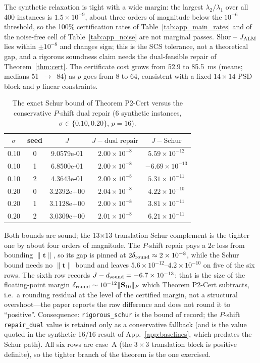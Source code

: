 The synthetic relaxation is tight with a wide margin: the largest $\lambda_2/\lambda_1$ over all 400 instances is $1.5\times10^{-9}$, about three orders of magnitude below the $10^{-6}$ threshold, so the 100\% certification rates of Table~\ref{tab:app_main_rates} and of the noise-free cell of Table~\ref{tab:app_noise} are not marginal passes. $\mathrm{Shor}-J_{\rm ALM}$ lies within $\pm10^{-8}$ and changes sign; this is the SCS tolerance, not a theoretical gap, and a rigorous soundness claim needs the dual-feasible repair of Theorem~\ref{thm:cert}. The certificate cost grows from 52.9 to 85.5~ms (means; medians 51~$\to$~84) as $p$ goes from 8 to 64, consistent with a fixed $14\times14$ PSD block and $p$ linear constraints.

\begin{table}[t]
\centering
\caption{The exact Schur bound of Theorem P2-Cert versus the conservative $P$-shift dual repair (6 synthetic instances, $\sigma\in\{0.10,0.20\}$, $p=16$).}
\label{tab:app_schur}
\scriptsize
\setlength{\tabcolsep}{3pt}
\begin{tabular}{@{}ccccc@{}}
\toprule
$\sigma$ & seed & $J$ & $J-\text{dual repair}$ & $J-\text{Schur}$ \\
\midrule
0.10 & 0 & 9.0579e-01 & $2.00\times10^{-8}$ & $5.59\times10^{-12}$ \\
0.10 & 1 & 6.8500e-01 & $2.00\times10^{-8}$ & $-6.69\times10^{-13}$ \\
0.10 & 2 & 4.3643e-01 & $2.00\times10^{-8}$ & $5.31\times10^{-11}$ \\
0.20 & 0 & 3.2392e+00 & $2.04\times10^{-8}$ & $4.22\times10^{-10}$ \\
0.20 & 1 & 3.1128e+00 & $2.00\times10^{-8}$ & $3.81\times10^{-11}$ \\
0.20 & 2 & 3.0309e+00 & $2.01\times10^{-8}$ & $6.21\times10^{-11}$ \\
\bottomrule
\end{tabular}

\end{table}

Both bounds are sound; the 13$\times$13 translation Schur complement is the tighter one by about four orders of magnitude. The $P$-shift repair pays a $2c$ loss from bounding $\|\mathbf t\|$, so its gap is pinned at $2\delta_{\rm round}\approx2\times10^{-8}$, while the Schur bound needs no $\|\mathbf t\|$ bound and leaves $5.6\times10^{-12}$--$4.2\times10^{-10}$ on five of the six rows. The sixth row records $J-d_{\rm sound}=-6.7\times10^{-13}$: that is the size of the floating-point margin $\delta_{\rm round}\sim10^{-12}\|\mathbf S_{10}\|_F$ which Theorem P2-Cert subtracts, i.e.\ a rounding residual at the level of the certified margin, not a structural overshoot---the paper reports the raw difference and does not round it to ``positive''. Consequence: \texttt{rigorous\_schur} is the bound of record; the $P$-shift \texttt{repair\_dual} value is retained only as a conservative fallback (and is the value quoted in the synthetic 16/16 result of App.~\ref{app:baselines}, which predates the Schur path). All six rows are case~A (the $3\times3$ translation block is positive definite), so the tighter branch of the theorem is the one exercised.

